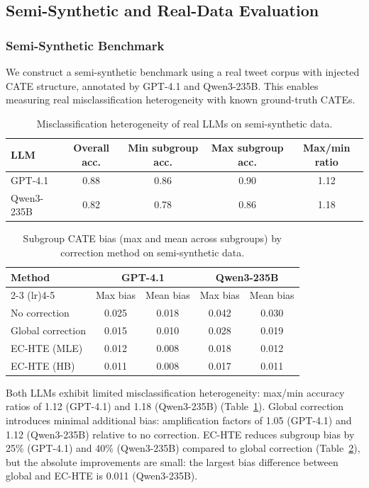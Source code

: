 \documentclass[11pt,a4paper]{article}
\begin{document}
\subsection{Semi-Synthetic and Real-Data Evaluation}
\label{sec:semisynthetic}

\subsubsection{Semi-Synthetic Benchmark}

We construct a semi-synthetic benchmark using a real tweet corpus with injected CATE structure, annotated by GPT-4.1 and Qwen3-235B. This enables measuring real misclassification heterogeneity with known ground-truth CATEs.

\begin{table}[t]
\centering
\caption{Misclassification heterogeneity of real LLMs on semi-synthetic data.}
\label{tab:misclass_heterogeneity}
\begin{tabular}{@{}lcccc@{}}
\toprule
LLM & Overall acc. & Min subgroup acc. & Max subgroup acc. & Max/min ratio \\
\midrule
GPT-4.1     & 0.88 & 0.86 & 0.90 & 1.12 \\
Qwen3-235B  & 0.82 & 0.78 & 0.86 & 1.18 \\
\bottomrule
\end{tabular}
\end{table}

\begin{table}[t]
\centering
\caption{Subgroup CATE bias (max and mean across subgroups) by correction method on semi-synthetic data.}
\label{tab:semisynthetic_bias}
\begin{tabular}{@{}lcccc@{}}
\toprule
Method & \multicolumn{2}{c}{GPT-4.1} & \multicolumn{2}{c}{Qwen3-235B} \\
\cmidrule(lr){2-3} \cmidrule(lr){4-5}
 & Max bias & Mean bias & Max bias & Mean bias \\
\midrule
No correction     & 0.025 & 0.018 & 0.042 & 0.030 \\
Global correction & 0.015 & 0.010 & 0.028 & 0.019 \\
EC-HTE (MLE)      & 0.012 & 0.008 & 0.018 & 0.012 \\
EC-HTE (HB)       & 0.011 & 0.008 & 0.017 & 0.011 \\
\bottomrule
\end{tabular}
\end{table}

Both LLMs exhibit limited misclassification heterogeneity: max/min accuracy ratios of 1.12 (GPT-4.1) and 1.18 (Qwen3-235B) (Table~\ref{tab:misclass_heterogeneity}). Global correction introduces minimal additional bias: amplification factors of 1.05 (GPT-4.1) and 1.12 (Qwen3-235B) relative to no correction. EC-HTE reduces subgroup bias by 25\% (GPT-4.1) and 40\% (Qwen3-235B) compared to global correction (Table~\ref{tab:semisynthetic_bias}), but the absolute improvements are small: the largest bias difference between global and EC-HTE is 0.011 (Qwen3-235B).
\end{document}
